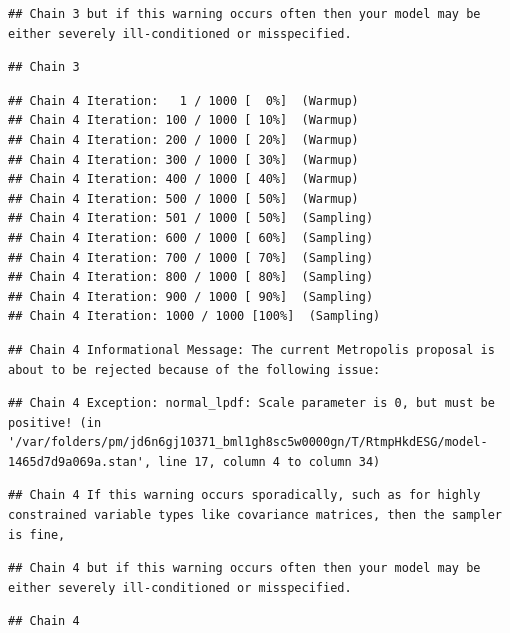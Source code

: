\documentclass[
]{article}
\begin{document}
\begin{verbatim}
## Chain 3 but if this warning occurs often then your model may be either severely ill-conditioned or misspecified.
\end{verbatim}

\begin{verbatim}
## Chain 3
\end{verbatim}

\begin{verbatim}
## Chain 4 Iteration:   1 / 1000 [  0%]  (Warmup) 
## Chain 4 Iteration: 100 / 1000 [ 10%]  (Warmup) 
## Chain 4 Iteration: 200 / 1000 [ 20%]  (Warmup) 
## Chain 4 Iteration: 300 / 1000 [ 30%]  (Warmup) 
## Chain 4 Iteration: 400 / 1000 [ 40%]  (Warmup) 
## Chain 4 Iteration: 500 / 1000 [ 50%]  (Warmup) 
## Chain 4 Iteration: 501 / 1000 [ 50%]  (Sampling) 
## Chain 4 Iteration: 600 / 1000 [ 60%]  (Sampling) 
## Chain 4 Iteration: 700 / 1000 [ 70%]  (Sampling) 
## Chain 4 Iteration: 800 / 1000 [ 80%]  (Sampling) 
## Chain 4 Iteration: 900 / 1000 [ 90%]  (Sampling) 
## Chain 4 Iteration: 1000 / 1000 [100%]  (Sampling)
\end{verbatim}

\begin{verbatim}
## Chain 4 Informational Message: The current Metropolis proposal is about to be rejected because of the following issue:
\end{verbatim}

\begin{verbatim}
## Chain 4 Exception: normal_lpdf: Scale parameter is 0, but must be positive! (in '/var/folders/pm/jd6n6gj10371_bml1gh8sc5w0000gn/T/RtmpHkdESG/model-1465d7d9a069a.stan', line 17, column 4 to column 34)
\end{verbatim}

\begin{verbatim}
## Chain 4 If this warning occurs sporadically, such as for highly constrained variable types like covariance matrices, then the sampler is fine,
\end{verbatim}

\begin{verbatim}
## Chain 4 but if this warning occurs often then your model may be either severely ill-conditioned or misspecified.
\end{verbatim}

\begin{verbatim}
## Chain 4
\end{verbatim}
\end{document}
